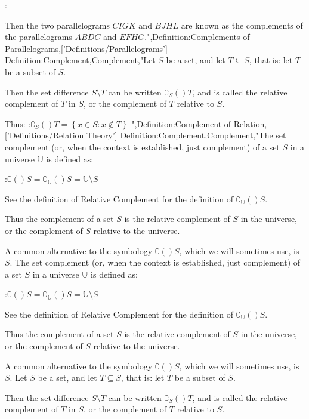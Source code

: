 :

Then the two parallelograms $CIGK$ and $BJHL$ are known as the complements of the parallelograms $ABDC$ and $EFHG$.",Definition:Complements of Parallelograms,['Definitions/Parallelograms']
Definition:Complement,Complement,"Let $S$ be a set, and let $T \subseteq S$, that is: let $T$ be a subset of $S$.

Then the set difference $S \setminus T$ can be written $\complement_{S} \left(   \right)T$, and is called the relative complement of $T$ in $S$, or the complement of $T$ relative to $S$.

Thus:
:$\complement_{S} \left(   \right)T = \left\lbrace x \in S : x \notin T \right\rbrace$
",Definition:Complement of Relation,['Definitions/Relation Theory']
Definition:Complement,Complement,"The set complement (or, when the context is established, just complement) of a set $S$ in a universe $\mathbb U$ is defined as:

:$\complement \left(   \right)S = \complement_{\mathbb U} \left(   \right)S = \mathbb U \setminus S$

See the definition of Relative Complement for the definition of $\complement_{\mathbb U} \left(   \right)S$.


Thus the complement of a set $S$ is the relative complement of $S$ in the universe, or the complement of $S$ relative to the universe.

A common alternative to the symbology $\complement \left(   \right)S$, which we will sometimes use, is $\overline S$.
The set complement (or, when the context is established, just complement) of a set $S$ in a universe $\mathbb U$ is defined as:

:$\complement \left(   \right)S = \complement_{\mathbb U} \left(   \right)S = \mathbb U \setminus S$

See the definition of Relative Complement for the definition of $\complement_{\mathbb U} \left(   \right)S$.


Thus the complement of a set $S$ is the relative complement of $S$ in the universe, or the complement of $S$ relative to the universe.

A common alternative to the symbology $\complement \left(   \right)S$, which we will sometimes use, is $\overline S$.
Let $S$ be a set, and let $T \subseteq S$, that is: let $T$ be a subset of $S$.

Then the set difference $S \setminus T$ can be written $\complement_{S} \left(   \right)T$, and is called the relative complement of $T$ in $S$, or the complement of $T$ relative to $S$.

